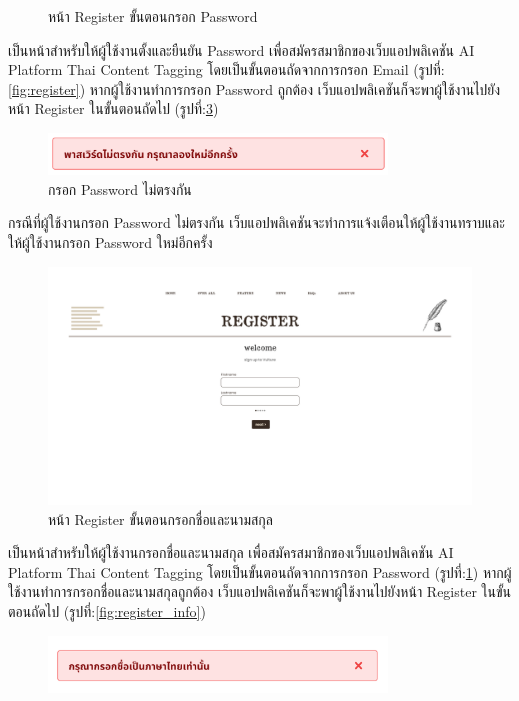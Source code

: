 \documentclass[12pt,oneside,openright,a4paper]{cpe-thai-project}
\begin{document}
\begin{itemize}
\begin{figure}[!ht]
  \caption{หน้า Register ขั้นตอนกรอก Password}\label{fig:register_password} 
\end{figure}
\hspace*{1cm}เป็นหน้าสำหรับให้ผู้ใช้งานตั้งและยืนยัน Password เพื่อสมัครสมาชิกของเว็บแอปพลิเคชัน AI Platform Thai Content Tagging 
โดยเป็นขั้นตอนถัดจากการกรอก Email (รูปที่:\ref{fig:register}) หากผู้ใช้งานทำการกรอก Password ถูกต้อง เว็บแอปพลิเคชันก็จะพาผู้ใช้งานไปยังหน้า Register ในขั้นตอนถัดไป (รูปที่:\ref{fig:register_name})
\begin{figure}[!ht]\centering
  \includegraphics[width=9cm]{./img/project_ui/password.png} 
  \caption{กรอก Password ไม่ตรงกัน}\label{fig:password} 
\end{figure}
\newline\hspace*{1cm}กรณีที่ผู้ใช้งานกรอก Password ไม่ตรงกัน เว็บแอปพลิเคชันจะทำการแจ้งเตือนให้ผู้ใช้งานทราบและให้ผู้ใช้งานกรอก Password ใหม่อีกครั้ง
\begin{figure}[!ht]\centering
  \includegraphics[width=14cm]{./img/project_ui/6.png} 
  \caption{หน้า Register ขั้นตอนกรอกชื่อและนามสกุล}\label{fig:register_name} 
\end{figure} \newpage
\hspace*{1cm}เป็นหน้าสำหรับให้ผู้ใช้งานกรอกชื่อและนามสกุล เพื่อสมัครสมาชิกของเว็บแอปพลิเคชัน AI Platform Thai Content Tagging 
โดยเป็นขั้นตอนถัดจากการกรอก Password (รูปที่:\ref{fig:register_password}) หากผู้ใช้งานทำการกรอกชื่อและนามสกุลถูกต้อง เว็บแอปพลิเคชันก็จะพาผู้ใช้งานไปยังหน้า Register ในขั้นตอนถัดไป (รูปที่:\ref{fig:register_info})
\begin{figure}[!ht]\centering
  \includegraphics[width=9cm]{./img/project_ui/thaionly.png} 

\end{figure}
\end{itemize}
\end{document}

